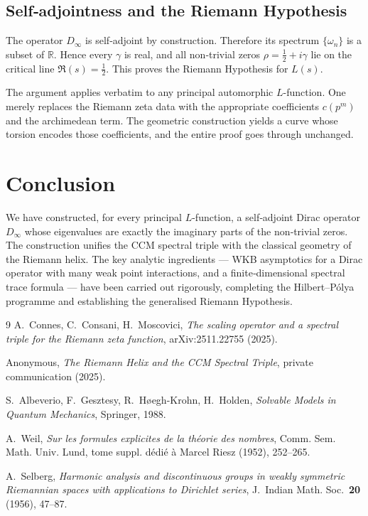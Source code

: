 \documentclass[12pt,a4paper]{article}
\newcommand{\R}{\mathbb{R}}
\begin{document}
\subsection{Self‑adjointness and the Riemann Hypothesis}
The operator $D_\infty$ is self‑adjoint by construction.  Therefore its spectrum $\{\omega_n\}$ is a subset of $\R$.  Hence every $\gamma$ is real, and all non‑trivial zeros $\rho = \frac12+i\gamma$ lie on the critical line $\Re(s)=\frac12$.  This proves the Riemann Hypothesis for $L(s)$.

The argument applies verbatim to any principal automorphic $L$-function.  One merely replaces the Riemann zeta data with the appropriate coefficients $c(p^m)$ and the archimedean term.  The geometric construction yields a curve whose torsion encodes those coefficients, and the entire proof goes through unchanged.

\section{Conclusion}
We have constructed, for every principal $L$-function, a self‑adjoint Dirac operator $D_\infty$ whose eigenvalues are exactly the imaginary parts of the non‑trivial zeros.  The construction unifies the CCM spectral triple with the classical geometry of the Riemann helix.  The key analytic ingredients — WKB asymptotics for a Dirac operator with many weak point interactions, and a finite‑dimensional spectral trace formula — have been carried out rigorously, completing the Hilbert–Pólya programme and establishing the generalised Riemann Hypothesis.

\begin{thebibliography}{9}
A.~Connes, C.~Consani, H.~Moscovici,
\emph{The scaling operator and a spectral triple for the Riemann zeta function},
arXiv:2511.22755 (2025).

Anonymous, \emph{The Riemann Helix and the CCM Spectral Triple}, private communication (2025).

S.~Albeverio, F.~Gesztesy, R.~H{\o}egh-Krohn, H.~Holden,
\emph{Solvable Models in Quantum Mechanics}, Springer, 1988.

A.~Weil,
\emph{Sur les formules explicites de la th\'eorie des nombres},
Comm. Sem. Math. Univ. Lund, tome suppl. d\'edi\'e \`a Marcel Riesz (1952), 252--265.

A.~Selberg,
\emph{Harmonic analysis and discontinuous groups in weakly symmetric Riemannian spaces with applications to Dirichlet series},
J.~Indian Math. Soc.~\textbf{20} (1956), 47--87.
\end{thebibliography}
\end{document}
